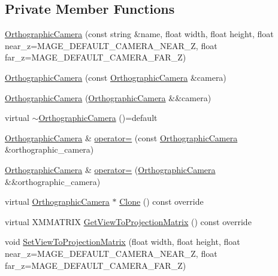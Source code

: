 \subsection*{Private Member Functions}
\begin{DoxyCompactItemize}
\item 
\hyperlink{classmage_1_1_orthographic_camera_a7d8b48144b0ef2e2f0aa4f06f3858abd}{Orthographic\+Camera} (const string \&name, float width, float height, float near\+\_\+z=M\+A\+G\+E\+\_\+\+D\+E\+F\+A\+U\+L\+T\+\_\+\+C\+A\+M\+E\+R\+A\+\_\+\+N\+E\+A\+R\+\_\+Z, float far\+\_\+z=M\+A\+G\+E\+\_\+\+D\+E\+F\+A\+U\+L\+T\+\_\+\+C\+A\+M\+E\+R\+A\+\_\+\+F\+A\+R\+\_\+Z)
\item 
\hyperlink{classmage_1_1_orthographic_camera_aad12a2901577a187bb53e4c2e2f5a658}{Orthographic\+Camera} (const \hyperlink{classmage_1_1_orthographic_camera}{Orthographic\+Camera} \&camera)
\item 
\hyperlink{classmage_1_1_orthographic_camera_ac7b6bd4cb086403e130e5deaaa16046d}{Orthographic\+Camera} (\hyperlink{classmage_1_1_orthographic_camera}{Orthographic\+Camera} \&\&camera)
\item 
virtual \hyperlink{classmage_1_1_orthographic_camera_abdad923634e17f217ba975a9149f6c57}{$\sim$\+Orthographic\+Camera} ()=default
\item 
\hyperlink{classmage_1_1_orthographic_camera}{Orthographic\+Camera} \& \hyperlink{classmage_1_1_orthographic_camera_a8ea679c9b4c3d2c6aef40119dbf60921}{operator=} (const \hyperlink{classmage_1_1_orthographic_camera}{Orthographic\+Camera} \&orthographic\+\_\+camera)
\item 
\hyperlink{classmage_1_1_orthographic_camera}{Orthographic\+Camera} \& \hyperlink{classmage_1_1_orthographic_camera_a0b6856bd3e7a3402300225470e7d10e8}{operator=} (\hyperlink{classmage_1_1_orthographic_camera}{Orthographic\+Camera} \&\&orthographic\+\_\+camera)
\item 
virtual \hyperlink{classmage_1_1_orthographic_camera}{Orthographic\+Camera} $\ast$ \hyperlink{classmage_1_1_orthographic_camera_ae075c08e4af88f74212bf5c84d2e5b2a}{Clone} () const override
\item 
virtual X\+M\+M\+A\+T\+R\+IX \hyperlink{classmage_1_1_orthographic_camera_aedd86e56a0f7bc967ad8d9be2631a0cf}{Get\+View\+To\+Projection\+Matrix} () const override
\item 
void \hyperlink{classmage_1_1_orthographic_camera_a1ff2b3e4467049b978155d652a687c2d}{Set\+View\+To\+Projection\+Matrix} (float width, float height, float near\+\_\+z=M\+A\+G\+E\+\_\+\+D\+E\+F\+A\+U\+L\+T\+\_\+\+C\+A\+M\+E\+R\+A\+\_\+\+N\+E\+A\+R\+\_\+Z, float far\+\_\+z=M\+A\+G\+E\+\_\+\+D\+E\+F\+A\+U\+L\+T\+\_\+\+C\+A\+M\+E\+R\+A\+\_\+\+F\+A\+R\+\_\+Z)
\end{DoxyCompactItemize}
